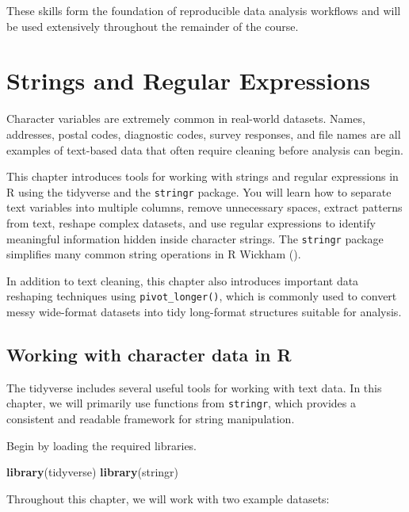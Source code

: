 \documentclass[
  11pt,
  oneside]{book}
\newenvironment{Shaded}{\begin{snugshade}}{\end{snugshade}}
\newcommand{\FunctionTok}[1]{\textcolor[rgb]{0.13,0.29,0.53}{\textbf{#1}}}
\newcommand{\NormalTok}[1]{#1}
\begin{document}
These skills form the foundation of reproducible data analysis workflows and will be used extensively throughout the remainder of the course.

\chapter{Strings and Regular Expressions}\label{strings-and-regular-expressions}

Character variables are extremely common in real-world datasets. Names, addresses, postal codes, diagnostic codes, survey responses, and file names are all examples of text-based data that often require cleaning before analysis can begin.

This chapter introduces tools for working with strings and regular expressions in R using the tidyverse and the \texttt{stringr} package. You will learn how to separate text variables into multiple columns, remove unnecessary spaces, extract patterns from text, reshape complex datasets, and use regular expressions to identify meaningful information hidden inside character strings. The \texttt{stringr} package simplifies many common string operations in R Wickham ().

In addition to text cleaning, this chapter also introduces important data reshaping techniques using \texttt{pivot\_longer()}, which is commonly used to convert messy wide-format datasets into tidy long-format structures suitable for analysis.

\section{Working with character data in R}\label{working-with-character-data-in-r}

The tidyverse includes several useful tools for working with text data. In this chapter, we will primarily use functions from \texttt{stringr}, which provides a consistent and readable framework for string manipulation.

Begin by loading the required libraries.

\begin{Shaded}
\begin{Highlighting}[]
\FunctionTok{library}\NormalTok{(tidyverse)}
\FunctionTok{library}\NormalTok{(stringr)}
\end{Highlighting}
\end{Shaded}

Throughout this chapter, we will work with two example datasets:
\end{document}
